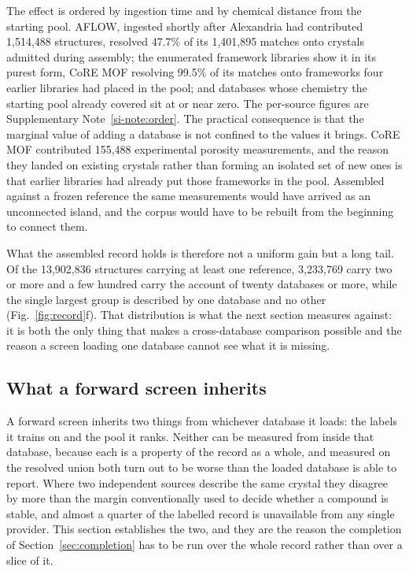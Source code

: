 The effect is ordered by ingestion time and by chemical distance from the
starting pool. AFLOW, ingested shortly after Alexandria had contributed
1{,}514{,}488 structures, resolved 47.7\% of its 1{,}401{,}895 matches onto
crystals admitted during assembly; the enumerated framework libraries show it in
its purest form, CoRE MOF resolving 99.5\% of its matches onto frameworks four
earlier libraries had placed in the pool; and databases whose chemistry the
starting pool already covered sit at or near zero. The per-source figures are
Supplementary Note~\ref{si-note:order}. The practical consequence is that the
marginal value of adding a database is not confined to the values it brings. CoRE
MOF contributed 155{,}488 experimental porosity measurements, and the reason they
landed on existing crystals rather than forming an isolated set of new ones is
that earlier libraries had already put those frameworks in the pool. Assembled
against a frozen reference the same measurements would have arrived as an
unconnected island, and the corpus would have to be rebuilt from the beginning to
connect them.

What the assembled record holds is therefore not a uniform gain but a long tail.
Of the 13{,}902{,}836 structures carrying at least one reference, 3{,}233{,}769
carry two or more and a few hundred carry the account of twenty databases or
more, while the single largest group is described by one database and no other
(Fig.~\ref{fig:record}f). That distribution is what the next section measures
against: it is both the only thing that makes a cross-database comparison
possible and the reason a screen loading one database cannot see what it is
missing.

\subsection{What a forward screen inherits}
\label{sec:inherits}

A forward screen inherits two things from whichever database it loads: the labels
it trains on and the pool it ranks. Neither can be measured from inside that
database, because each is a property of the record as a whole, and measured on the
resolved union both turn out to be worse than the loaded database is able to
report. Where two independent sources describe the same crystal they disagree by
more than the margin conventionally used to decide whether a compound is stable,
and almost a quarter of the labelled record is unavailable from any single
provider. This section establishes the two, and they are the reason the
completion of Section~\ref{sec:completion} has to be run over the whole record
rather than over a slice of it.

